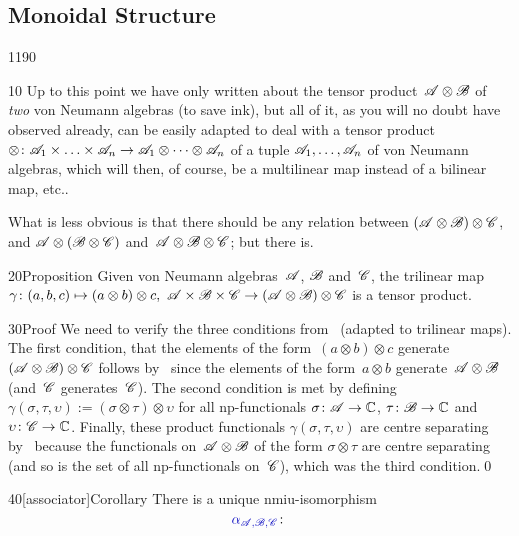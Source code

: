 \subsection{Monoidal Structure}
\begin{parsec}{1190}%
\begin{point}{10}%
Up to this point
we have only written about the tensor product~$\mathscr{A}\otimes \mathscr{B}$
of \emph{two} von Neumann algebras
(to save ink),
but all of it,
as you will no doubt have observed already,
can be easily adapted 
to deal with
a tensor product
$\otimes\colon \mathscr{A}_1\times\dotsc\times \mathscr{A}_n
\to\mathscr{A}_1\otimes \dotsb\otimes \mathscr{A}_n$
of a tuple $\mathscr{A}_1,\dotsc,\mathscr{A}_n$ of von Neumann algebras,
which will then, of course, be a multilinear map
instead of a bilinear map, etc..

What is less obvious
is that there should be any relation
between 
$(\mathscr{A}\otimes\mathscr{B})\otimes \mathscr{C}$,
and 
$\mathscr{A}\otimes (\mathscr{B}\otimes \mathscr{C})$
and~$\mathscr{A}\otimes\mathscr{B}\otimes\mathscr{C}$;
but there is.
\end{point}
\begin{point}{20}{Proposition}%
Given von Neumann algebras~$\mathscr{A}$, $\mathscr{B}$ and~$\mathscr{C}$,
the trilinear map $\gamma\colon (a,b,c)\mapsto (a\otimes b)\otimes c,\ 
\scrA\times\scrB\times\scrC \to (\scrA\otimes \scrB)\otimes\scrC$
is a tensor product.
\begin{point}{30}{Proof}%
We need to verify the three conditions
from~ (adapted
to trilinear maps).
The first condition,
that the elements of the form~$(a\otimes b)\otimes c$
generate $(\mathscr{A}\otimes \mathscr{B})\otimes \mathscr{C}$
follows
by~
since
the elements of the form~$a\otimes b$
generate~$\mathscr{A}\otimes \mathscr{B}$
(and~$\mathscr{C}$ generates~$\mathscr{C}$).
The second condition
is met by defining
$\gamma(\sigma,\tau,\upsilon):= (\sigma\otimes\tau)\otimes\upsilon$
for all np-functionals
$\sigma\colon \mathscr{A}\to\mathbb{C}$,
$\tau\colon \mathscr{B} \to\mathbb{C}$
and~$\upsilon\colon \mathscr{C}\to\mathbb{C}$.
Finally,
these product functionals
$\gamma(\sigma,\tau,\upsilon)$
are centre separating by~
because
the functionals on~$\mathscr{A}\otimes \mathscr{B}$
of the form $\sigma\otimes\tau$
are centre separating (and so is
the set of all np-functionals on~$\mathscr{C}$),
which was the third condition.\qed
\end{point}
\end{point}
\begin{point}{40}[associator]{Corollary}%
There is a unique nmiu-isomorphism
\begin{equation*}
    \Define{\alpha_{\scrA,\scrB,\scrC}}\colon 

\end{equation*}
\end{point}
\end{parsec}
